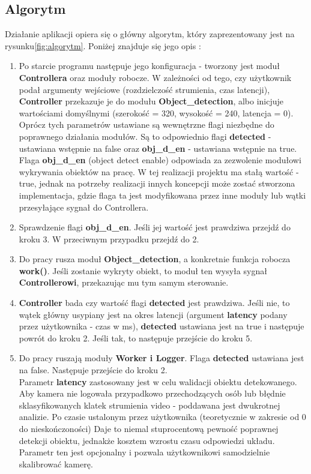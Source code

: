 \subsection{Algorytm}
Działanie aplikacji opiera się o główny algorytm, który zaprezentowany jest na rysunku\ref{fig:algorytm}. Poniżej znajduje się jego opis :\\
\begin{enumerate}
\item Po starcie programu następuje jego konfiguracja - tworzony jest moduł\textbf{ Controllera} oraz moduły robocze. W zależności od tego, czy użytkownik podał argumenty wejściowe (rozdzielczość strumienia, czas latencji), \textbf{Controller} przekazuje je do modułu\textbf{ Object\_detection}, albo inicjuje wartościami domyślnymi (szerokość  = 320, wysokość = 240, latencja = 0). Oprócz tych parametrów ustawiane są wewnętrzne flagi niezbędne do poprawnego działania modułów. Są to odpowiednio flagi \textbf{detected} - ustawiana wstępnie na false oraz\textbf{ obj\_d\_en }- ustawiana wstępnie na true. Flaga \textbf{ obj\_d\_en } (object detect enable) odpowiada za zezwolenie modułowi wykrywania obiektów na pracę. W tej realizacji projektu ma stałą wartość - true, jednak na potrzeby realizacji innych koncepcji może zostać stworzona implementacja, gdzie flaga ta jest modyfikowana przez inne moduły lub wątki przesyłające sygnał do Controllera.\\
\item Sprawdzenie flagi \textbf{ obj\_d\_en}. Jeśli jej wartość jest prawdziwa przejdź do kroku 3. W przeciwnym przypadku przejdź do 2.\\
\item Do pracy rusza moduł \textbf{ Object\_detection}, a konkretnie funkcja robocza \textbf{work()}.
Jeśli zostanie wykryty obiekt, to moduł ten wysyła sygnał \textbf{Controllerowi}, przekazując mu tym samym sterowanie.\\
\item \textbf{Controller} bada czy wartość flagi \textbf{detected} jest prawdziwa. Jeśli nie, to wątek główny usypiany jest na okres latencji (argument \textbf{latency} podany przez użytkownika - czas w ms), \textbf{detected} ustawiana jest na true i następuje powrót do kroku 2. Jeśli tak, to następuje przejście do kroku 5.\\
\item Do pracy ruszają moduły \textbf{ Worker i Logger}. Flaga \textbf{detected }ustawiana jest na false. Następuje przejście do kroku 2.\\
Parametr \textbf{latency} zastosowany jest w celu walidacji obiektu detekowanego. Aby kamera nie logowała przypadkowo przechodzących osób lub błędnie sklasyfikowanych klatek strumienia video - poddawana jest dwukrotnej analizie. Po czasie ustalonym przez użytkownika (teoretycznie w zakresie od 0 do nieskończoności) Daje to niemal stuprocentową pewność poprawnej detekcji obiektu, jednakże kosztem wzrostu czasu odpowiedzi układu. Parametr ten jest opcjonalny i pozwala użytkownikowi samodzielnie skalibrować kamerę.
\end{enumerate}
